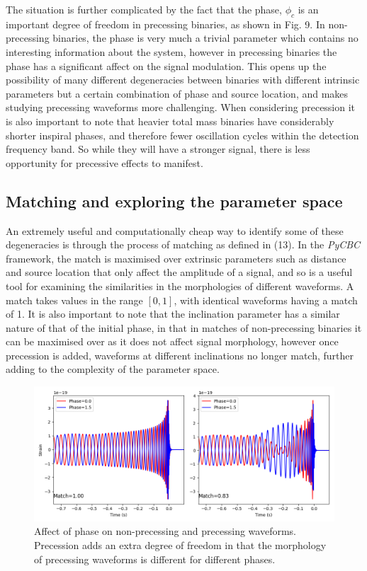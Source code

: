 \documentclass[11pt]{article}
\begin{document}
The situation is further complicated by the fact that the phase, $\phi_c$ is an important degree of freedom in precessing binaries, as shown in Fig. 9. In non-precessing binaries, the phase is very much a trivial parameter which contains no interesting information about the system, however in precessing binaries the phase has a significant affect on the signal modulation. This opens up the possibility of many different degeneracies between binaries with different intrinsic parameters but a certain combination of phase and source location, and makes studying precessing waveforms more challenging. When considering precession it is also important to note that heavier total mass binaries have considerably shorter inspiral phases, and therefore fewer oscillation cycles within the detection frequency band. So while they will have a stronger signal, there is less opportunity for precessive effects to manifest.
\subsection{Matching and exploring the parameter space}
An extremely useful and computationally cheap way to identify some of these degeneracies is through the process of matching as defined in (13). In the \textit{PyCBC} framework, the match is maximised over extrinsic parameters such as distance and source location that only affect the amplitude of a signal, and so is a useful tool for examining the similarities in the morphologies of different waveforms. A match takes values in the range $[0,1]$, with identical waveforms having a match of 1. It is also important to note that the inclination parameter has a similar nature of that of the initial phase, in that in matches of non-precessing binaries it can be maximised over as it does not affect signal morphology, however once precession is added, waveforms at different inclinations no longer match, further adding to the complexity of the parameter space.

\begin{figure}
	\includegraphics[scale=0.58]{fig9.png}
	\centering
	\caption{Affect of phase on non-precessing and precessing waveforms. Precession adds an extra degree of freedom in that the morphology of precessing waveforms is different for different phases.}
	\centering
\end{figure}
\end{document}
